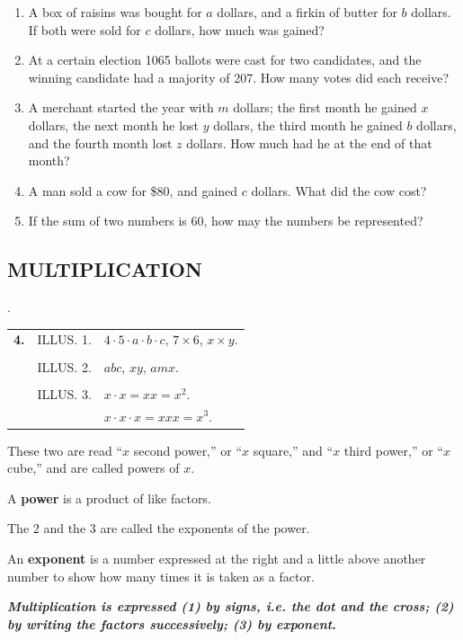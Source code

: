 \documentclass{book}
\begin{document}
\begin{enumerate}
\item A box of raisins was bought for $a$ dollars, and a firkin of
butter for $b$ dollars. If both were sold for $c$ dollars, how
much was gained?

\item At a certain election 1065 ballots were cast for two
candidates, and the winning candidate had a majority of 207. How
many votes did each receive?

\item A merchant started the year with $m$ dollars; the first
month he gained $x$ dollars, the next month he lost $y$ dollars,
the third month he gained $b$ dollars, and the fourth month lost
$z$ dollars. How much had he at the end of that month?

\item A man sold a cow for \$80, and gained $c$ dollars. What did
the cow cost?

\item If the sum of two numbers is 60, how may the numbers be
represented?
\end{enumerate}

\subsection*{MULTIPLICATION}.

\begin{tabular}{cll}
\textbf{ 4.} &ILLUS. 1. &$4 \cdot 5 \cdot a \cdot b \cdot c$, $7
\times 6$,
$x \times y$.\\
\\
&ILLUS. 2. &$abc$, $xy$, $amx$.\\
\\
&ILLUS. 3. &$x \cdot x = xx = x^2$.\\
&&$x \cdot x \cdot x = xxx = x^3$.
\end{tabular}

These two are read ``$x$ second power,'' or ``$x$ square,'' and
``$x$ third power,'' or ``$x$ cube,'' and are called powers of
$x$.

A \textbf{ power} is a product of like factors.

The 2 and the 3 are called the exponents of the power.

An \textbf{ exponent} is a number expressed at the right and a
little above another number to show how many times it is taken as
a factor.

\textbf{ \textit{Multiplication is expressed (1) by signs, i.e.
the dot and the cross; (2) by writing the factors successively;
(3) by exponent}.}
\end{document}
